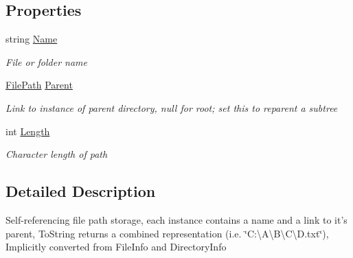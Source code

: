 \subsection*{Properties}
\begin{DoxyCompactItemize}
\item 
string \hyperlink{class_cloud_api_public_1_1_model_1_1_file_path_a02285f24ec2d49c85778d6b5a251aa7b}{Name}
\begin{DoxyCompactList}\small\item\em File or folder name \end{DoxyCompactList}\item 
\hyperlink{class_cloud_api_public_1_1_model_1_1_file_path}{File\-Path} \hyperlink{class_cloud_api_public_1_1_model_1_1_file_path_a4c3e4582847856e2a49370fb421d4c70}{Parent}
\begin{DoxyCompactList}\small\item\em Link to instance of parent directory, null for root; set this to reparent a subtree \end{DoxyCompactList}\item 
int \hyperlink{class_cloud_api_public_1_1_model_1_1_file_path_a6e415515bb70328b0ac881f9703be2c2}{Length}
\begin{DoxyCompactList}\small\item\em Character length of path \end{DoxyCompactList}\end{DoxyCompactItemize}


\subsection{Detailed Description}
Self-\/referencing file path storage, each instance contains a name and a link to it's parent, To\-String returns a combined representation (i.\-e. \char`\"{}\-C\-:\textbackslash{}\-A\textbackslash{}\-B\textbackslash{}\-C\textbackslash{}\-D.\-txt\char`\"{}), Implicitly converted from File\-Info and Directory\-Info 




